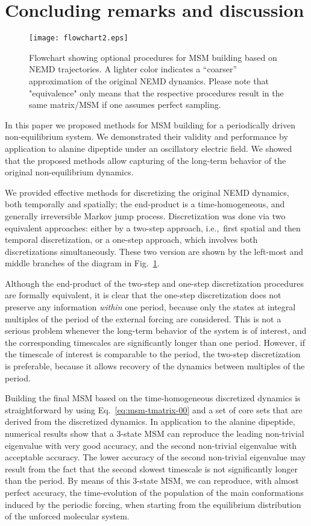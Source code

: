 \documentclass[journal=jctcce,manuscript=article]{achemso}
\begin{document}
\section{Concluding remarks and discussion}
\label{sec:conclusion}

\begin{figure}
  \centering
  \texttt{[image: flowchart2.eps]}
  \caption{Flowchart showing optional procedures for MSM building based on NEMD trajectories. A lighter color indicates
  a ``coarser'' approximation of the original NEMD dynamics. Please note that "equivalence" only means that the respective procedures result in the same matrix/MSM if one assumes perfect sampling.}
  \label{fig:flowchart}
\end{figure}

In this paper we proposed methods for MSM building for a periodically driven
non-equilibrium system. We demonstrated their validity and performance by application to  alanine dipeptide under an oscillatory electric field. We showed that the proposed 
methods allow capturing of the long-term behavior of the original
non-equilibrium dynamics.

We provided effective methods for discretizing the original NEMD dynamics,
both temporally and spatially; the end-product is a time-homogeneous, and  generally irreversible Markov jump process.
Discretization was done via two equivalent approaches:
either by a two-step approach,
i.e.,~first spatial and then temporal discretization,
or a one-step approach, which involves both discretizations simultaneously.
These two version are shown by the left-most and middle branches of the diagram  in Fig.~\ref{fig:flowchart}.

Although the end-product of the two-step and one-step discretization procedures are formally equivalent,
it is clear that the one-step discretization does not preserve any information
\emph{within} one period, because only the states
at integral multiples of the period of the external forcing are considered. This is not a serious problem
whenever the long-term behavior of the system is of interest, and
the corresponding timescales are significantly longer than one
period. However, if the timescale of interest 
is comparable to the period, the two-step
discretization is preferable, because it allows recovery of the dynamics between multiples of
the period. 

Building the final MSM based on the time-homogeneous discretized dynamics is straightforward by
using Eq.~\eqref{eq:msm-tmatrix-00} and a set of core sets that are
derived from the discretized dynamics.  In application to the alanine dipeptide, numerical
results show that a 3-state MSM can reproduce the leading non-trivial
eigenvalue with very good accuracy, and the second non-trivial
eigenvalue with acceptable accuracy. The lower accuracy of the
second non-trivial eigenvalue may result from the fact that the second
slowest timescale is not significantly longer than the period. By means of
this 3-state MSM, we can reproduce, with almost perfect
accuracy, the time-evolution of the population of the main conformations induced by the periodic forcing, when starting from the  
equilibrium distribution of the unforced molecular system.
\end{document}
